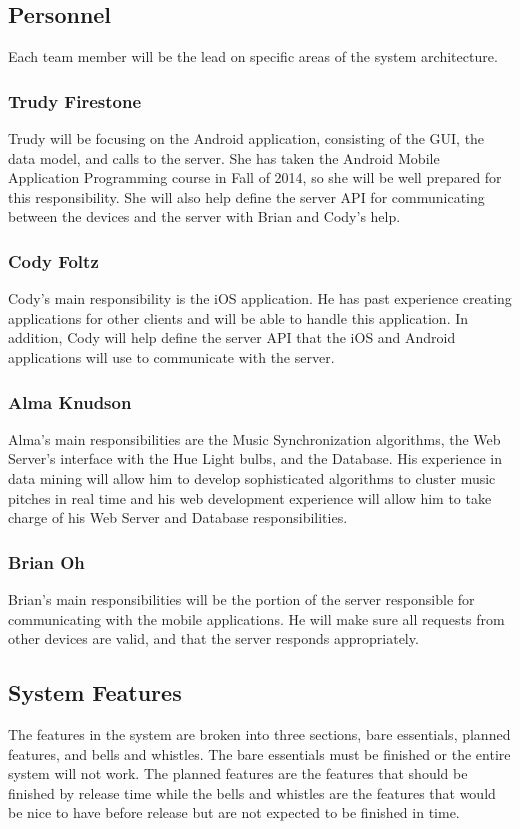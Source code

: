 \documentclass[12pt]{article}
\begin{document}
\subsection{Personnel}
Each team member will be the lead on specific areas of the system architecture.
\subsubsection*{Trudy Firestone}
Trudy will be focusing on the Android application, consisting of the GUI, the data model, and calls to the server. She has taken the Android Mobile Application Programming course in Fall of 2014, so she will be well prepared for this responsibility. She will also help define the server API for communicating between the devices and the server with Brian and Cody's help. 
\subsubsection*{Cody Foltz}
Cody's main responsibility is the iOS application.  He has past experience creating applications for other clients and will be able to handle this application.  In addition, Cody will help define the server API that the iOS and Android applications will use to communicate with the server.

\subsubsection*{Alma Knudson}
Alma's main responsibilities are the Music Synchronization algorithms, the Web Server's interface with the Hue Light bulbs, and the Database. His experience in data mining will allow him to develop sophisticated algorithms to cluster music pitches in real time and his web development experience will allow him to take charge of his Web Server and Database responsibilities. 

\subsubsection*{Brian Oh}
Brian's main responsibilities will be the portion of the server responsible for communicating with the mobile applications. He will make sure all requests from other devices are valid, and that the server responds appropriately.

\subsection{System Features}
The features in the system are broken into three sections, bare essentials, planned features, and bells and whistles.  The bare essentials must be finished or the entire system will not work.  The planned features are the features that should be finished by release time while the bells and whistles are the features that would be nice to have before release but are not expected to be finished in time.
\end{document}
